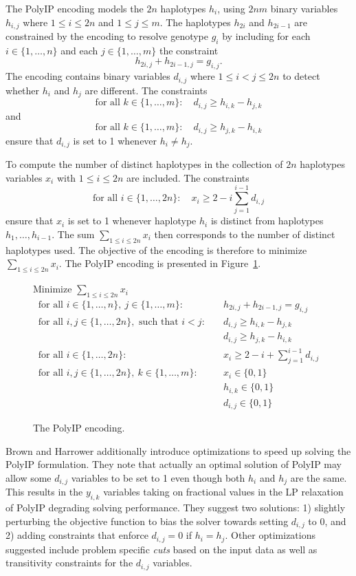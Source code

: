 \documentclass[12pt,a4paper]{article}
\begin{document}
The PolyIP encoding models the $2n$ haplotypes $h_i$, using $2nm$ binary variables $h_{i,j}$ where $1\leq i \leq 2n$ and $1\leq j \leq m$.
The haplotypes $h_{2i}$ and $h_{2i-1}$ are constrained by the encoding to resolve genotype $g_i$ by including for each $i\in\{1, \dots , n\}$ and each $j\in\{1,\dots ,m\}$ the constraint
$$ h_{2i,j} + h_{2i-1,j} = g_{i,j}. $$
The encoding contains binary variables $d_{i,j}$ where $1\leq i<j\leq 2n$ to detect whether $h_i$ and $h_j$ are different.
The constraints 
$$ \text{for all }k\in\{1,\dots ,m\}:\quad  d_{i,j} \geq h_{i,k}-h_{j,k} $$
and
$$ \text{for all }k\in\{1,\dots ,m\}:\quad  d_{i,j} \geq h_{j,k}-h_{i,k} $$
ensure that $d_{i,j}$ is set to 1 whenever $h_i\neq h_j$.

To compute the number of distinct haplotypes in the collection of $2n$ haplotypes variables $x_i$ with $1\leq i\leq 2n$ are included.
The constraints
$$ \text{for all }i\in\{1,\dots ,2n\}:\quad  x_{i} \geq 2 - i \sum_{j=1}^{i-1} d_{i,j} $$
ensure that $x_i$ is set to 1 whenever haplotype $h_i$ is distinct from haplotypes $h_1,\dots , h_{i-1}$.
The sum $\sum_{1\leq i\leq 2n} x_i$ then corresponds to the number of distinct haplotypes used.
The objective of the encoding is therefore to minimize $\sum_{1\leq i\leq 2n} x_i$.
The PolyIP encoding is presented in Figure~\ref{fig:enc-polyip}.

\begin{figure}
\centering
Minimize $\sum_{1\leq i \leq 2n} x_i$
\begin{align}
\text{for all  }i\in\{1,\dots , n\},\ j\in\{1,\dots ,m\}:&\quad h_{2i,j} + h_{2i-1,j} = g_{i,j} \\
\text{for all  }i, j\in\{1,\dots , 2n\},\text{ such that } i<j:&\quad d_{i,j} \geq h_{i,k}-h_{j,k} \\
&\quad d_{i,j} \geq h_{j,k}-h_{i,k} \\
\text{for all  }i\in\{1,\dots , 2n\}:&\quad x_{i} \geq 2 - i +  \sum_{j=1}^{i-1} d_{i,j} \\
\text{for all  }i,j\in\{1,\dots , 2n\},\ k\in\{1,\dots ,m\}:&\quad x_i\in\{0,1\} \\
&\quad h_{i,k}\in\{0,1\} \\
&\quad d_{i,j}\in\{0,1\}
\end{align}
\caption{The PolyIP encoding.}
\label{fig:enc-polyip}
\end{figure}

Brown and Harrower additionally introduce optimizations to speed up solving the PolyIP formulation.
They note that actually an optimal solution of PolyIP may allow some $d_{i,j}$ variables to be set to 1 even though both $h_i$ and $h_j$ are the same.  
This results in the $y_{i,k}$ variables taking on fractional values in the LP relaxation of PolyIP degrading solving performance.
They suggest two solutions: 1) slightly perturbing the objective function to bias the solver towards setting $d_{i,j}$ to 0, 
and 2) adding constraints that enforce $d_{i,j}=0$ if $h_i=h_j$.
Other optimizations suggested include problem specific \emph{cuts} based on the input data as well as transitivity constraints for the $d_{i,j}$ variables.
\end{document}
